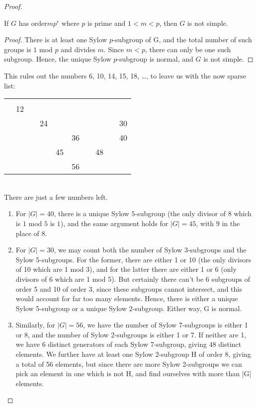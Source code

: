 \begin{proof}
\begin{theorem}
    If $G$ has order$ mp^r$ where $p$ is prime and $1 < m < p$, then $G$ is not simple.
\end{theorem}


\begin{proof}
    There is at least one Sylow $p$-subgroup of G, and the total number of such groups is $1$ mod $p$ and divides $m$. Since $m < p$, there can only be one such subgroup. Hence, the unique Sylow $p$-subgroup is normal, and $G$ is not simple.
\end{proof}

This rules out the numbers 6, 10, 14, 15, 18, …, to leave us with the now sparse list:\\

\begin{tabular}{llllllllll}
    \toprule
      &   &   &   &   &   &   &   &   &  \\ 
     & 12 &  &  &  &  &  &  &  &  \\
     &  &  & 24 &  &  &  &  &  & 30 \\
     &  &  &  &  & 36 &  &  &  & 40 \\
     &  &  &  & 45 &  &  & 48 &  &  \\
     &  &  &  &  & 56 &  &  &  &    \\ \bottomrule
\end{tabular}\\

There are just a few numbers left.

\begin{enumerate}[<i>]
    \item For $|G| = 40$, there is a unique Sylow $5$-subgroup (the only divisor of 8 which is $1$ mod $5$ is $1$), and the same argument holds for $|G| = 45$, with $9$ in the place of $8$.
    \item For $|G| = 30$, we may count both the number of Sylow 3-subgroups and the Sylow 5-subgroups. For the former, there are either 1 or 10 (the only divisors of 10 which are 1 mod 3), and for the latter there are either 1 or 6 (only divisors of 6 which are 1 mod 5). But certainly there can’t be 6 subgroups of order 5 and 10 of order 3, since these subgroups cannot intersect, and this would account for far too many elements. Hence, there is either a unique Sylow 5-subgroup or a unique Sylow 2-subgroup. Either way, G is normal.
    \item Similarly, for $|G| = 56$, we have the number of Sylow 7-subgroups is either 1 or 8, and the number of Sylow 2-subgroups is either 1 or 7. If neither are 1, we have 6 distinct generators of each Sylow 7-subgroup, giving 48 distinct elements. We further have at least one Sylow 2-subgroup H of order 8, giving a total of 56 elements, but since there are more Sylow 2-subgroups we can pick an element in one which is not H, and find ourselves with more than |G| elements.
\end{enumerate}


\end{proof}
